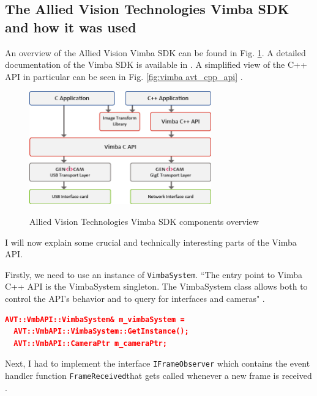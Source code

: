 \documentclass[a4paper, 12pt, oneside]{report}
\begin{document}
  \subsection{The Allied Vision Technologies Vimba SDK and how it was used}
  An overview of the Allied Vision Vimba SDK can be found in Fig. \ref{fig:vimba avt}. A detailed documentation of the Vimba SDK is available in \cite{VimbaCManualCPP-2020-02-17}.
  A simplified view of the C++ API in particular can be seen in Fig. \ref{fig:vimba avt_cpp_api} \cite{VimbaCManualCPP-2020-02-17}.
  
  \begin{figure}[h]
      \caption{Allied Vision Technologies Vimba SDK components overview \protect\cite{VimbaCManualCPP-2020-02-17}}
      \centering
      \includegraphics[width=0.7\textwidth]{Architecture-Linux}
      \label{fig:vimba avt}
  \end{figure}

  \vspace{0.2cm}
  
  \noindent I will now explain some crucial and technically interesting parts of the Vimba API.  
  
  \noindent Firstly, we need to use an instance of \texttt{VimbaSystem}. ``The entry point to Vimba C++ API is the VimbaSystem singleton. The VimbaSystem class allows both to control the API’s behavior and to query for interfaces and cameras" \cite{VimbaCManualCPP-2020-02-17}.

  \begin{lstlisting}[language=json,firstnumber=1]
  AVT::VmbAPI::VimbaSystem& m_vimbaSystem = 
  AVT::VmbAPI::VimbaSystem::GetInstance(); 
  AVT::VmbAPI::CameraPtr m_cameraPtr;
  \end{lstlisting}

  \noindent Next, I had to implement the interface \texttt{IFrameObserver} which contains the event handler function \texttt{FrameReceived}that gets called whenever a new frame is received \cite{VimbaCManualCPP-2020-02-17}.
  
\end{document}
